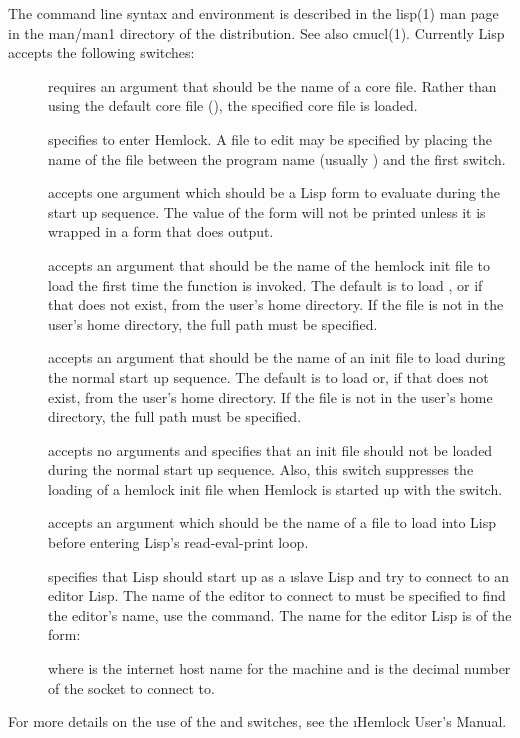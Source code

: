 The command line syntax and environment is described in the lisp(1) man page in
the man/man1 directory of the distribution.  See also cmucl(1).
Currently Lisp accepts the following switches:
\begin{description}

\item[] requires an argument that should be the name of a
core file.  Rather than using the default core file
(), the specified core file is
loaded.

\item[] specifies to enter Hemlock.  A file to edit may be
specified by placing the name of the file between the program name
(usually ) and the first switch.

\item[]
accepts one argument which should be a Lisp form to evaluate during
the start up sequence.  The value of the form will not be printed unless it is
wrapped in a form that does output.

\item[]
accepts an argument that should be the name of
the hemlock init file to load the first time the function
 is invoked.  The default is to load
, or if that does not
exist,  from the user's home directory.  If
the file is not in the user's home directory, the full path must be
specified.

\item[] accepts an argument that should be the name of an
init file to load during the normal start up sequence.  The default is
to load  or, if that does not exist,
 from the user's home directory.  If the file is not in
the user's home directory, the full path must be specified.

\item[]
accepts no arguments and specifies that an init file should not
be loaded during the normal start up sequence.  Also, this switch
suppresses the loading of a hemlock init file when Hemlock is started up
with the  switch.

\item[]
accepts an argument which should be the name of a file to load
into Lisp before entering Lisp's read-eval-print loop.

\item[] specifies that Lisp should start up as a \i{slave}
Lisp and try to connect to an editor Lisp.  The name of the editor to
connect to must be specified \dash{} to find the editor's name, use the
\hemlock{}  command.  The name for
the editor Lisp is of the form:
\begin{example}
\code{:}
\end{example}
where  is the internet host name for the machine and
 is the decimal number of the socket to connect to.
\end{description}
For more details on the use of the  and 
switches, see the \i{Hemlock User's Manual}.

